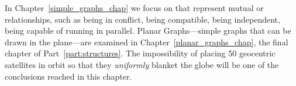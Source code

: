 In Chapter~\ref{simple_graphs_chap} we focus on \emph{} that represent mutual or \emph{}
relationships, such as being in conflict, \iffalse being congruent
modulo 17\fi being compatible, being independent, being capable of
running in parallel.  Planar Graphs---simple graphs that can be drawn
in the plane---are examined in Chapter~\ref{planar_graphs_chap}, the
final chapter of Part~\ref{part:structures}.  The impossibility of
placing 50 geocentric satellites in orbit so that they
\emph{uniformly} blanket the globe will be one of the conclusions
reached in this chapter.

\iffalse
This part of the text concludes with Chapter ~\ref{state_machine_chap}
which elaborates the use of the \emph{\idx{state machines}} in program
verification and modeling concurrent computation.
\fi

\endinput
